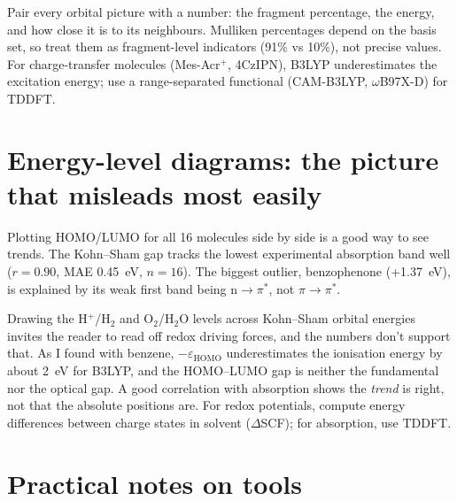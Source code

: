 \documentclass[11pt,a4paper]{article}
\begin{document}
\begin{takeaway}
Pair every orbital picture with a number: the fragment percentage, the energy, and how close it
is to its neighbours. Mulliken percentages depend on the basis set, so treat them as
fragment-level indicators (91\% vs 10\%), not precise values. For charge-transfer molecules
(Mes-Acr$^+$, 4CzIPN), B3LYP underestimates the excitation energy; use a range-separated
functional (CAM-B3LYP, $\omega$B97X-D) for TDDFT.
\end{takeaway}

\section{Energy-level diagrams: the picture that misleads most easily}

Plotting HOMO/LUMO for all 16 molecules side by side is a good way to see trends. The
Kohn--Sham gap tracks the lowest experimental absorption band well ($r = 0.90$, MAE 0.45~eV,
$n=16$). The biggest outlier, benzophenone (+1.37~eV), is explained by its weak first band
being n$\to\pi^*$, not $\pi\to\pi^*$.

\begin{pitfall}
Drawing the H$^+$/H$_2$ and O$_2$/H$_2$O levels across Kohn--Sham orbital energies invites the
reader to read off redox driving forces, and the numbers don't support that. As I found with
benzene, $-\varepsilon_\text{HOMO}$ underestimates the ionisation energy by about 2~eV for B3LYP,
and the HOMO--LUMO gap is neither the fundamental nor the optical gap. A good correlation with
absorption shows the \emph{trend} is right, not that the absolute positions are. For redox
potentials, compute energy differences between charge states in solvent ($\Delta$SCF); for
absorption, use TDDFT.
\end{pitfall}

\section{Practical notes on tools}
\end{document}
